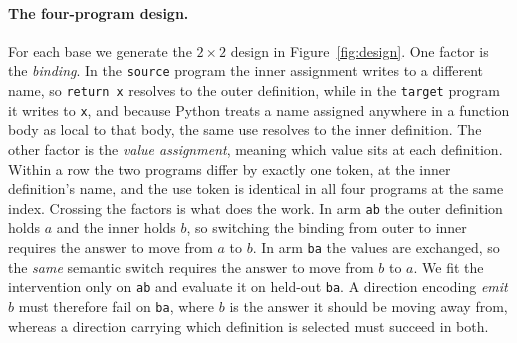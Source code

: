 \documentclass{article}
\begin{document}
\paragraph{The four-program design.}
For each base we generate the $2\times2$ design in Figure~\ref{fig:design}. One factor is the \emph{binding}. In the \texttt{source} program the inner assignment writes to a different name, so \texttt{return x} resolves to the outer definition, while in the \texttt{target} program it writes to \texttt{x}, and because Python treats a name assigned anywhere in a function body as local to that body, the same use resolves to the inner definition. The other factor is the \emph{value assignment}, meaning which value sits at each definition. Within a row the two programs differ by exactly one token, at the inner definition's name, and the use token is identical in all four programs at the same index. Crossing the factors is what does the work. In arm \texttt{ab} the outer definition holds $a$ and the inner holds $b$, so switching the binding from outer to inner requires the answer to move from $a$ to $b$. In arm \texttt{ba} the values are exchanged, so the \emph{same} semantic switch requires the answer to move from $b$ to $a$. We fit the intervention only on \texttt{ab} and evaluate it on held-out \texttt{ba}. A direction encoding \emph{emit $b$} must therefore fail on \texttt{ba}, where $b$ is the answer it should be moving away from, whereas a direction carrying which definition is selected must succeed in both.
\end{document}
